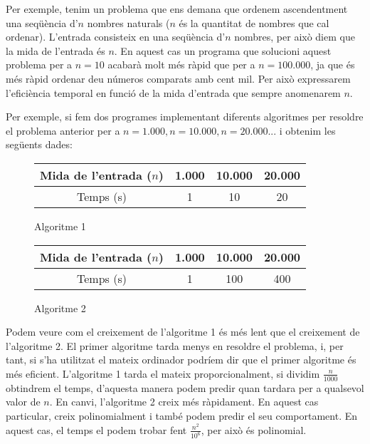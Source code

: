 
Per exemple, tenim un problema que ens demana que ordenem ascendentment una seqüència d'$n$ nombres naturals ($n$ és la quantitat de nombres que cal ordenar). L'entrada consisteix en una seqüència d'$n$ nombres, per això diem que la mida de l'entrada és $n$. En aquest cas un programa que solucioni aquest problema per a $n = 10$ acabarà molt més ràpid que per a $n = 100.000$, ja que és més ràpid ordenar deu números comparats amb cent mil. Per això expressarem l'eficiència temporal en funció de la mida d'entrada que sempre anomenarem $n$. 

Per exemple, si fem dos programes implementant diferents algoritmes per resoldre el problema anterior per a $n = 1.000, n = 10.000, n = 20.000...$ i obtenim les següents dades:

\begin{figure}[h]
    \begin{center}
    \renewcommand{\arraystretch}{1.5}
    \begin{tabular}{|c | c | c | c|} 
     \hline
     Mida de l'entrada ($n$) & 1.000 & 10.000 & 20.000 \\ 
     \hline
     Temps (s) & 1 & 10 & 20 \\
     \hline
    \end{tabular}
    \end{center}
    \caption{Algoritme 1}
    \label{fig:my_label}
\end{figure}    
\begin{figure}[h]
    \begin{center}
    \renewcommand{\arraystretch}{1.5}
    \begin{tabular}{|c | c | c | c|} 
     \hline
     Mida de l'entrada ($n$) & 1.000 & 10.000 & 20.000 \\ 
     \hline
     Temps (s) & 1 & 100 & 400 \\
     \hline
    \end{tabular}
    \end{center}
    \caption{Algoritme 2}
    \label{fig:my_label}
\end{figure}    

Podem veure com el creixement de l'algoritme 1 és més lent que el creixement de l'algoritme 2. El primer algoritme tarda menys en resoldre el problema, i, per tant, si s'ha utilitzat el mateix ordinador podríem dir que el primer algoritme és més eficient. L'algoritme 1 tarda el mateix proporcionalment, si dividim $\displaystyle\frac{n}{1000}$ obtindrem el temps, d'aquesta manera podem predir quan tardara per a qualsevol valor de $n$. En canvi, l'algoritme 2 creix més ràpidament. En aquest cas particular, creix polinomialment i també podem predir el seu comportament. En aquest cas, el temps el podem trobar fent $\displaystyle\frac{n^2}{10^6}$, per això és polinomial.

